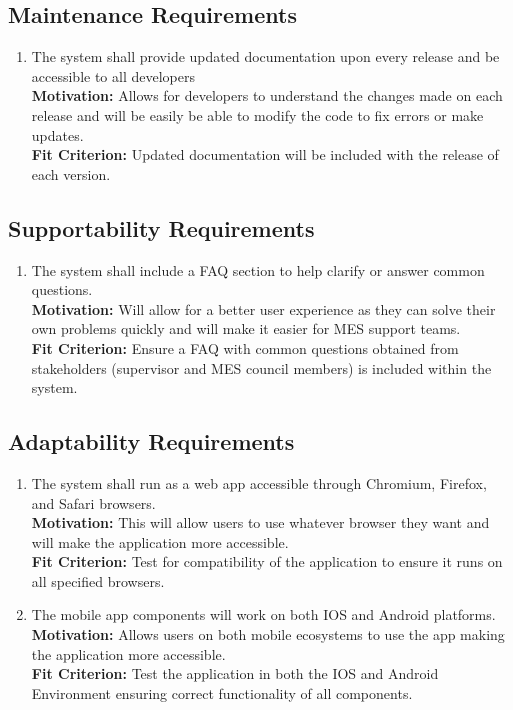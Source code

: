 \documentclass[12pt]{article}
\begin{document}
\subsection{Maintenance Requirements}
\begin{enumerate}[align=left,
  leftmargin=*,
  labelsep=1em,
  itemindent=0em,
  label=\bfseries MT-\arabic*:]
  \item \label{MSMR1} The system shall provide updated documentation upon every release and be accessible to all developers\\[2mm]
    {\bf Motivation:} Allows for developers to understand the changes made on each release and will be easily be able to modify the code to fix errors or make updates. \\
    {\bf Fit Criterion:} Updated documentation will be included with the release of each version.
\end{enumerate}
\subsection{Supportability Requirements}
\begin{enumerate}[align=left,
  leftmargin=*,
  labelsep=1em,
  itemindent=0em,
  label=\bfseries SU-\arabic*:]
  \item \label{MSSR1} The system shall include a FAQ section to help clarify or answer common questions.\\[2mm]
    {\bf Motivation:} Will allow for a better user experience as they can solve their own problems quickly and will make it easier for MES support teams. \\
    {\bf Fit Criterion:} Ensure a FAQ with common questions obtained from stakeholders (supervisor and MES council members) is included within the system.
\end{enumerate}
\subsection{Adaptability Requirements}
\begin{enumerate}[align=left,
  leftmargin=*,
  labelsep=1em,
  itemindent=0em,
  label=\bfseries AD-\arabic*:]
  \item \label{MSAR1} The system shall run as a web app accessible through Chromium, Firefox, and Safari browsers. \\[2mm]
    {\bf Motivation:} This will allow users to use whatever browser they want and will make the application more accessible. \\
    {\bf Fit Criterion:} Test for compatibility of the application to ensure it runs on all specified browsers.
  \item \label{MSAR2} The mobile app components will work on both IOS and Android platforms. \\[2mm]
    {\bf Motivation:} Allows users on both mobile ecosystems to use the app making the application more accessible. \\
    {\bf Fit Criterion:} Test the application in both the IOS and Android Environment ensuring correct functionality of all components.
\end{enumerate}
\end{document}
